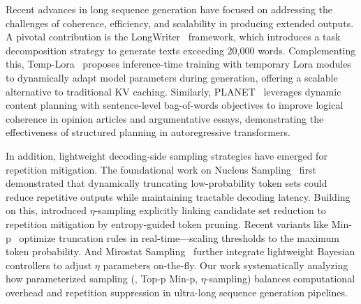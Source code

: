 Recent advances in long sequence generation have focused on addressing the challenges of coherence, efficiency, and scalability in producing extended outputs. A pivotal contribution is the LongWriter~\citep{longwriter} framework, which introduces a task decomposition strategy to generate texts exceeding 20,000 words. Complementing this, Temp-Lora~\citep{temp_lora} proposes inference-time training with temporary Lora modules to dynamically adapt model parameters during generation, offering a scalable alternative to traditional KV caching. Similarly, PLANET~\citep{planet} leverages dynamic content planning with sentence-level bag-of-words objectives to improve logical coherence in opinion articles and argumentative essays, demonstrating the effectiveness of structured planning in autoregressive transformers.

In addition, lightweight decoding-side sampling strategies have emerged for repetition mitigation. The foundational work on Nucleus Sampling~\citep{topp} first demonstrated that dynamically truncating low-probability token sets could reduce repetitive outputs while maintaining tractable decoding latency. Building on this, \citet{eta} introduced $\eta$-sampling explicitly linking candidate set reduction to repetition mitigation by entropy-guided token pruning. Recent variants like Min-p~\citep{minp} optimize truncation rules in real-time—scaling thresholds to the maximum token probability. 
And Mirostat Sampling~\citep{mirostat} further integrate lightweight Bayesian controllers to adjust $\eta$ parameters on-the-fly. Our work systematically analyzing how parameterized sampling (\eg, Top-p Min-p, $\eta$-sampling) balances computational overhead and repetition suppression in ultra-long sequence generation pipelines.
